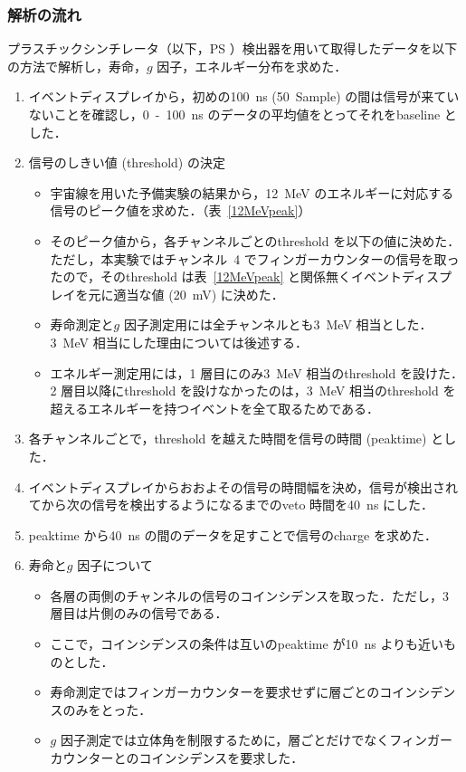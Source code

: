 \subsubsection{解析の流れ}
プラスチックシンチレータ（以下，PS ）検出器を用いて取得したデータを以下の方法で解析し，寿命，$g$ 因子，エネルギー分布を求めた．
\begin{enumerate}
\item イベントディスプレイから，初めの100~ns (50~Sample) の間は信号が来ていないことを確認し，0~-~100~ns のデータの平均値をとってそれをbaseline とした．
\item 信号のしきい値 (threshold) の決定
\begin{itemize}
\item 宇宙線を用いた予備実験の結果から，12~MeV のエネルギーに対応する信号のピーク値を求めた．（表~\ref{12MeVpeak}）%
\item そのピーク値から，各チャンネルごとのthreshold を以下の値に決めた．ただし，本実験ではチャンネル~4 でフィンガーカウンターの信号を取ったので，そのthreshold は表~\ref{12MeVpeak} と関係無くイベントディスプレイを元に適当な値 (20~mV) に決めた．
\item 寿命測定と$g$ 因子測定用には全チャンネルとも3~MeV 相当とした．3~MeV 相当にした理由については後述する．
\item エネルギー測定用には，1 層目にのみ3~MeV 相当のthreshold を設けた．2 層目以降にthreshold を設けなかったのは，3~MeV 相当のthreshold を超えるエネルギーを持つイベントを全て取るためである．
\end{itemize}
\item 各チャンネルごとで，threshold を越えた時間を信号の時間 (peaktime) とした．
\item イベントディスプレイからおおよその信号の時間幅を決め，信号が検出されてから次の信号を検出するようになるまでのveto 時間を40~ns にした．
\item peaktime から40~ns の間のデータを足すことで信号のcharge を求めた．
\item 寿命と$g$ 因子について
\begin{itemize}
\item 各層の両側のチャンネルの信号のコインシデンスを取った．ただし，3 層目は片側のみの信号である．
\item ここで，コインシデンスの条件は互いのpeaktime が10~ns よりも近いものとした．
\item 寿命測定ではフィンガーカウンターを要求せずに層ごとのコインシデンスのみをとった．
\item $g$ 因子測定では立体角を制限するために，層ごとだけでなくフィンガーカウンターとのコインシデンスを要求した．

\end{itemize}
\end{enumerate}
